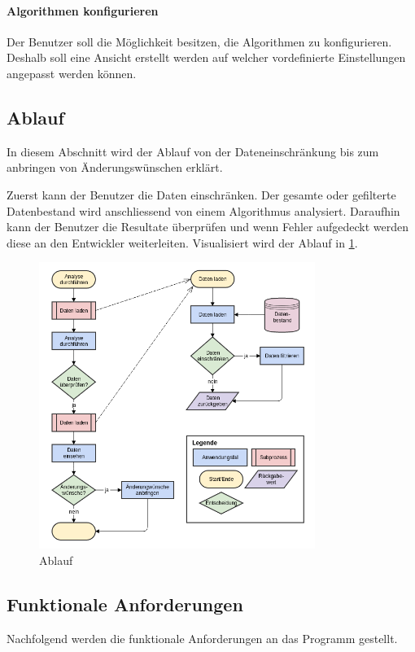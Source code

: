 \paragraph{Algorithmen konfigurieren} Der Benutzer soll die Möglichkeit besitzen, die Algorithmen zu konfigurieren. Deshalb soll eine Ansicht erstellt werden auf welcher vordefinierte Einstellungen angepasst werden können.

\subsection{Ablauf}
\label{sec:anforderungsanalyse:ablauf}
In diesem Abschnitt wird der Ablauf von der Dateneinschränkung bis zum anbringen von Änderungswünschen erklärt.

Zuerst kann der Benutzer die Daten einschränken. Der gesamte oder gefilterte Datenbestand wird anschliessend von einem Algorithmus analysiert. Daraufhin kann der Benutzer die Resultate überprüfen und wenn Fehler aufgedeckt werden diese an den Entwickler weiterleiten.
Visualisiert wird der Ablauf in \cref{fig:anfoderungsanalyse:ablauf:1}.

\begin{figure}[H]
	\RawFloats
	\centering
	\includegraphics[width=0.8\textwidth]{images/flowchart}
	\caption{Ablauf}
	\label{fig:anfoderungsanalyse:ablauf:1}
\end{figure}

\subsection{Funktionale Anforderungen}
\label{sec:anforderungsanalyse:funktionaleanforderung}
Nachfolgend werden die funktionale Anforderungen an das Programm gestellt.

